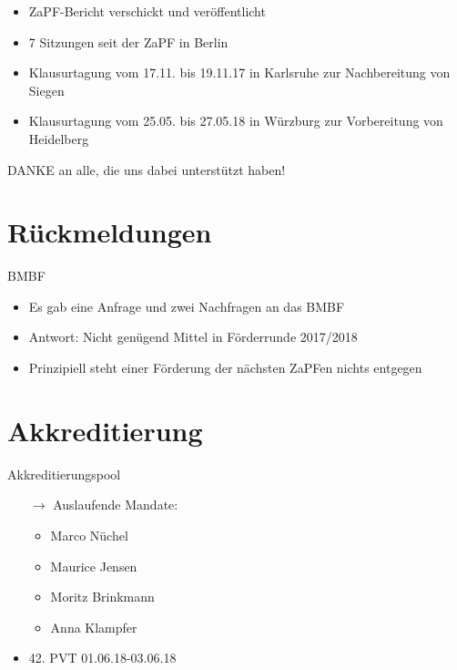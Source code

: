\documentclass[compress, aspectratio=169]{beamer}
\begin{document}
\begin{frame}
  \begin{itemize}
    \item ZaPF-Bericht verschickt und veröffentlicht
    \item 7 Sitzungen seit der ZaPF in Berlin
    \item Klausurtagung vom 17.11. bis 19.11.17 in Karlsruhe zur Nachbereitung von Siegen
    \item Klausurtagung vom 25.05. bis 27.05.18 in Würzburg zur Vorbereitung von Heidelberg
    \end{itemize}
    \vspace{5mm}
    \begin{center}
      \Large DANKE an alle, die uns dabei unterstützt haben!
    \end{center}
\end{frame}

\section{Rückmeldungen}

\begin{frame}{BMBF}
  \begin{itemize}
     \item Es gab eine Anfrage und zwei Nachfragen an das BMBF
     \item Antwort: Nicht genügend Mittel in Förderrunde 2017/2018
     \item Prinzipiell steht einer Förderung der nächsten ZaPFen nichts entgegen
  \end{itemize}
\end{frame}


\section{Akkreditierung}

\begin{frame}{Akkreditierungspool}
  \begin{itemize}
    \item[$\rightarrow$] Auslaufende Mandate:
      \begin{itemize}
          \item Marco Nüchel
          \item Maurice Jensen
          \item Moritz Brinkmann
          \item Anna Klampfer
      \end{itemize}
    \item 42. PVT 01.06.18-03.06.18
    \end{itemize}
\end{frame}
\end{document}
